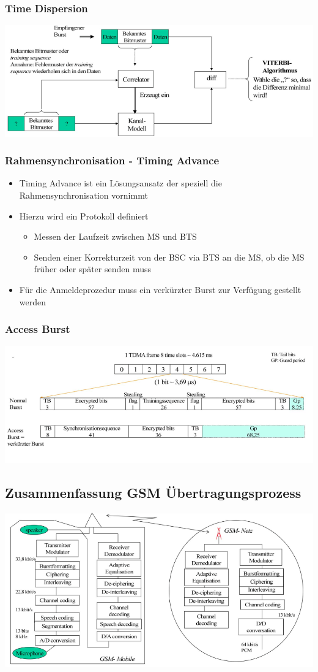 \subsubsection{Time Dispersion} 

\includegraphics[width = 0.6\linewidth]{./Pics/GSMTimeDispersion}

\subsubsection{Rahmensynchronisation - Timing Advance}
\begin{itemize}
\item Timing Advance ist ein Lösungsansatz der speziell die Rahmensynchronisation vornimmt
\item Hierzu wird ein Protokoll definiert
\begin{itemize}
\item Messen der Laufzeit zwischen MS und BTS
\item Senden einer Korrekturzeit von der BSC via BTS an die MS, ob die MS früher oder später senden muss
\end{itemize}
\item Für die Anmeldeprozedur muss ein verkürzter Burst zur Verfügung gestellt werden
\end{itemize}

\subsubsection{Access Burst}
\includegraphics[width = 0.6\linewidth]{./Pics/GSMAccessBurst}

\subsection{Zusammenfassung GSM Übertragungsprozess}

\includegraphics[width = 0.6\linewidth]{./Pics/GSMZusammenfassung}

